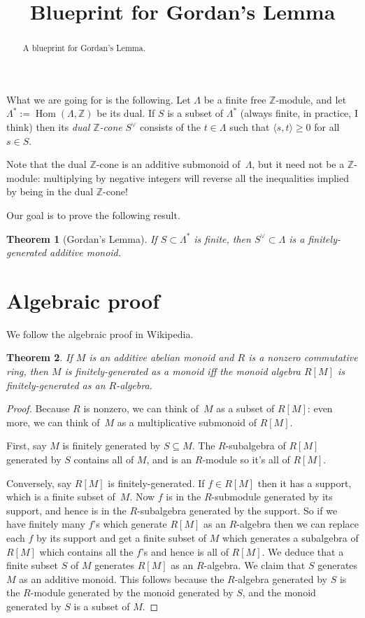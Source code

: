 \documentclass{amsart}
\newcommand{\Z}{\mathbb{Z}}
\DeclareMathOperator{\Hom}{Hom}
\newtheorem{theorem}{Theorem}
\begin{document}
\title[]{Blueprint for Gordan's Lemma}

\begin{abstract}
A blueprint for Gordan's Lemma.
\end{abstract}

\maketitle

What we are going for is the following. Let $\Lambda$ be a finite free $\Z$-module, and let $\Lambda^*:=\Hom(\Lambda,\Z)$ be its dual. If $S$ is a subset of $\Lambda^*$ (always finite, in practice, I think) then its \emph{dual $\Z$-cone} $S^\vee$ consists of the $t\in\Lambda$ such that $\langle s,t\rangle\geq0$ for all $s\in S$.

Note that the dual $\Z$-cone is an additive submonoid of~$\Lambda$, but it need not be a $\Z$-module: multiplying by negative integers will reverse all the inequalities implied by being in the dual $\Z$-cone!

Our goal is to prove the following result.

\begin{theorem}[Gordan's Lemma]
If $S \subset \Lambda^*$ is finite, then $S^\vee \subset \Lambda$ is a finitely-generated additive monoid.
\end{theorem}

\section{Algebraic proof}

We follow the algebraic proof in Wikipedia.

\begin{theorem} \label{t:RMfg}
If $M$ is an additive abelian monoid and $R$ is a nonzero commutative ring, then $M$ is finitely-generated as a monoid iff the monoid algebra $R[M]$ is finitely-generated as an $R$-algebra.
\end{theorem}
\begin{proof} Because $R$ is nonzero, we can think of~$M$ as a subset of $R[M]$: even more, we can think of~$M$ as a multiplicative submonoid of $R[M]$.

First, say $M$ is finitely generated by $S\subseteq M$. The $R$-subalgebra of $R[M]$ generated by $S$ contains all of $M$, and is an $R$-module so it's all of $R[M]$.

Conversely, say $R[M]$ is finitely-generated. If $f\in R[M]$ then it has a support, which is a finite subset of~$M$. Now $f$ is in the $R$-submodule generated by its support, and hence is in the $R$-subalgebra generated by the support. So if we have finitely many $f$'s which generate $R[M]$ as an $R$-algebra then we can replace each $f$ by its support and get a finite subset of $M$ which generates a subalgebra of $R[M]$ which contains all the $f$'s and hence is all of $R[M]$. We deduce that a finite subset $S$ of $M$ generates $R[M]$ as an $R$-algebra. We claim that $S$ generates $M$ as an additive monoid. This follows because the $R$-algebra generated by $S$ is the $R$-module generated by the monoid generated by $S$, and the monoid generated by $S$ is a subset of $M$.
\end{proof}
\end{document}
